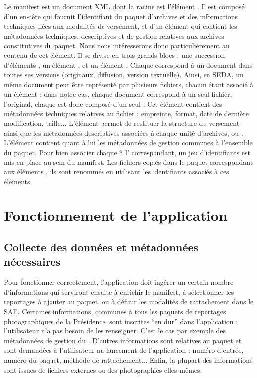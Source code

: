 \newpage
Le manifest est un document XML dont la racine est l'élément . Il est composé d'un en-tête qui fournit l'identifiant du paquet d'archives et des informations techniques liées aux modalités de versement, et d'un élément  qui contient les métadonnées techniques, descriptives et de gestion relatives aux archives constitutives du paquet. Nous nous intéresserons donc particulièrement au contenu de cet élément. Il se divise en trois grands blocs : une succession d'éléments , un élément , et un élément . Chaque  correspond à un document dans toutes ses versions (originaux, diffusion, version textuelle). Ainsi, en SEDA, un même document peut être représenté par plusieurs fichiers, chacun étant associé à un élément  : dans notre cas, chaque document correspond à un seul fichier, l'original,  chaque  est donc composé d'un seul . Cet élément contient des métadonnées techniques relatives au fichier : empreinte, format, date de dernière modification, taille... L'élément  permet de restituer la structure du versement ainsi que les métadonnées descriptives associées à chaque unité d'archives, ou . L'élément  contient quant à lui les métadonnées de gestion communes à l'ensemble du paquet. Pour bien associer chaque  à l'  correspondant, un jeu d'identifiants est mis en place au sein du manifest. Les fichiers copiés dans le paquet correspondant aux éléments , ils sont renommés en utilisant les identifiants associés à ces éléments.

\section{Fonctionnement de l'application}

\subsection*{Collecte des données et métadonnées nécessaires}
Pour fonctionner correctement, l'application doit ingérer un certain nombre d'informations qui serviront ensuite à enrichir le manifest, à sélectionner les reportages à ajouter au paquet, ou à définir les modalités de rattachement dans le SAE. Certaines informations, communes à tous les paquets de reportages photographiques de la Présidence, sont inscrites \enquote{en dur} dans l'application : l'utilisateur n'a pas besoin de les renseigner. C'est le cas par exemple des métadonnées de gestion du . D'autres informations sont relatives au paquet et sont demandées à l'utilisateur au lancement de l'application : numéro d'entrée, numéro du paquet, méthode de rattachement... Enfin, la plupart des informations sont issues de fichiers externes ou des photographies elles-mêmes.

